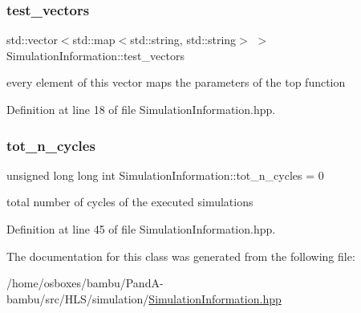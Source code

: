 \mbox{\label{classSimulationInformation_a2594fb526e8e327a65cd211abf67b65a}} 
\subsubsection{\texorpdfstring{test\+\_\+vectors}{test\_vectors}}
{\footnotesize\ttfamily std\+::vector$<$std\+::map$<$std\+::string, std\+::string$>$ $>$ Simulation\+Information\+::test\+\_\+vectors}



every element of this vector maps the parameters of the top function 



Definition at line 18 of file Simulation\+Information.\+hpp.

\mbox{\label{classSimulationInformation_a643f38c4c50bfaffda485b87fb3a70e5}} 
\subsubsection{\texorpdfstring{tot\+\_\+n\+\_\+cycles}{tot\_n\_cycles}}
{\footnotesize\ttfamily unsigned long long int Simulation\+Information\+::tot\+\_\+n\+\_\+cycles = 0}



total number of cycles of the executed simulations 



Definition at line 45 of file Simulation\+Information.\+hpp.



The documentation for this class was generated from the following file\+:\begin{DoxyCompactItemize}
\item 
/home/osboxes/bambu/\+Pand\+A-\/bambu/src/\+H\+L\+S/simulation/\hyperlink{SimulationInformation_8hpp}{Simulation\+Information.\+hpp}\end{DoxyCompactItemize}
